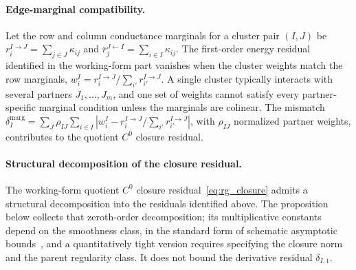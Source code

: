 \paragraph{Edge-marginal compatibility.}
Let the row and column conductance marginals for a cluster pair $(I, J)$ be $r_i^{I \to J} = \sum_{j \in J}\kappa_{ij}$ and $\bar{r}_j^{J \leftarrow I} = \sum_{i \in I}\kappa_{ij}$. The first-order energy residual identified in the working-form part vanishes when the cluster weights match the row marginals, $w_i^I = r_i^{I \to J}/\sum_{i'}r_{i'}^{I \to J}$. A single cluster typically interacts with several partners $J_1, \ldots, J_m$, and one set of weights cannot satisfy every partner-specific marginal condition unless the marginals are colinear. The mismatch $\delta_I^{\mathrm{marg}} = \sum_J \rho_{IJ}\sum_{i \in I}|w_i^I - r_i^{I \to J}/\sum_{i'}r_{i'}^{I \to J}|$, with $\rho_{IJ}$ normalized partner weights, contributes to the quotient $C^0$ closure residual.

\paragraph{Structural decomposition of the closure residual.}
The working-form quotient $C^0$ closure residual~\eqref{eq:rg_closure} admits a structural decomposition into the residuals identified above. The proposition below collects that zeroth-order decomposition; its multiplicative constants depend on the smoothness class, in the standard form of schematic asymptotic bounds~\cite{wong2001asymptotic}, and a quantitatively tight version requires specifying the closure norm and the parent regularity class. It does not bound the derivative residual $\delta_{I,1}$.

